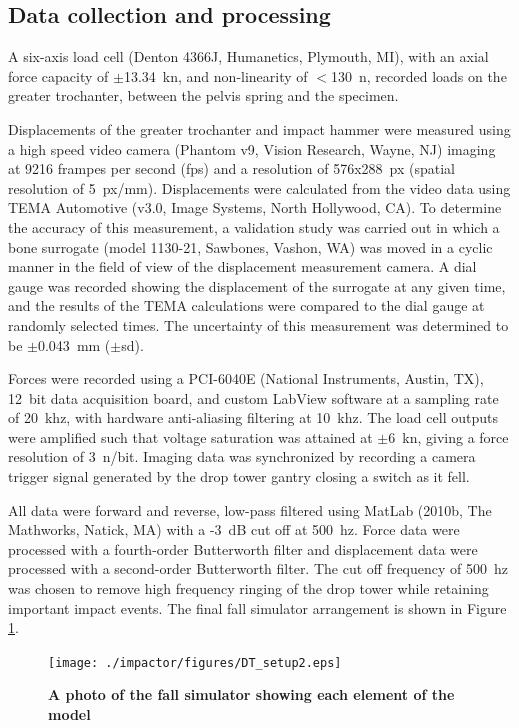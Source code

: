 	\subsection{Data collection and processing}
	\label{sec:fall_sim_design_methods_data}
	A six-axis load cell (Denton 4366J, Humanetics, Plymouth, MI), with an axial force capacity of $\pm$13.34~\ac{kn}, and non-linearity of $<$130~\ac{n}, recorded loads on the greater trochanter, between the pelvis spring and the specimen.
	
	Displacements of the greater trochanter and impact hammer were measured using a high speed video camera (Phantom v9, Vision Research, Wayne, NJ) imaging at 9216 frampes per second (fps) and a resolution of 576x288~\ac{px} (spatial resolution of 5~\ac{px}/\ac{mm}).
	Displacements were calculated from the video data using TEMA Automotive (v3.0, Image Systems, North Hollywood, CA).
	To determine the accuracy of this measurement, a validation study was carried out in which a bone surrogate (model 1130-21, Sawbones, Vashon, WA) was moved in a cyclic manner in the field of view of the displacement measurement camera.
	A dial gauge was recorded showing the displacement of the surrogate at any given time, and the results of the TEMA calculations were compared to the dial gauge at randomly selected times.
	The uncertainty of this measurement was determined to be $\pm$0.043~\ac{mm} ($\pm$\ac{sd}).
	
	Forces were recorded using a PCI-6040E (National Instruments, Austin, TX), 12~bit data acquisition board, and custom LabView software at a sampling rate of 20~\ac{khz}, with hardware anti-aliasing filtering at 10~\ac{khz}.
	The load cell outputs were amplified such that voltage saturation was attained at $\pm$6~\ac{kn}, giving a force resolution of 3~\ac{n}/bit.
	Imaging data was synchronized by recording a camera trigger signal generated by the drop tower gantry closing a switch as it fell.
	
	All data were forward and reverse, low-pass filtered using MatLab (2010b, The Mathworks, Natick, MA) with a -3~dB cut off at 500~\ac{hz}.
	Force data were processed with a fourth-order Butterworth filter and displacement data were processed with a second-order Butterworth filter.
	The cut off frequency of 500~\ac{hz} was chosen to remove high frequency ringing of the drop tower while retaining important impact events.
	The final fall simulator arrangement is shown in Figure \ref{fig:DT_setup}.
	
	\begin{figure}
		\centering
		\texttt{[image: ./impactor/figures/DT\_setup2.eps]}
		\caption[Photo of the fall simulator]{\textbf{A photo of the fall simulator showing each element of the model}}
		\label{fig:DT_setup}
	\end{figure}


